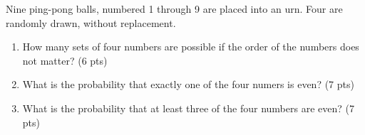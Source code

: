 
\item Nine ping-pong balls, numbered 1 through 9 are placed into an urn. Four are randomly drawn, without replacement.

\begin{enumerate}

\item How many sets of four numbers are possible if the order of the numbers does not matter? (6 pts)

\vfill

\item What is the probability that exactly one of the four numers is even? (7 pts)

\vfill


\item What is the probability that at least three of the four numbers are even? (7 pts)

\vfill

\end{enumerate}
